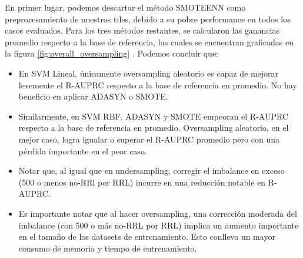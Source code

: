 En primer lugar, podemos descartar el método SMOTEENN como preprocesamiento de nuestros tiles, debido a su pobre performance en todos los casos evaluados. Para los tres métodos restantes, se calcularon las ganancias promedio respecto a la base de referencia, las cuales se encuentran graficadas en la figura \ref{fig:overall_oversampling} . Podemos concluír que:
\begin{itemize}
\item En SVM Lineal, únicamente oversampling aleatorio es capaz de mejorar levemente el R-AUPRC respecto a la base de referencia en promedio. No hay beneficio en aplicar ADASYN o SMOTE.
\item Similarmente, en SVM RBF, ADASYN y SMOTE empeoran el R-AUPRC respecto a la base de referencia en promedio. Oversampling aleatorio, en el mejor caso, logra igualar o superar el R-AUPRC promedio pero con una pérdida importante en el peor caso.
\item Notar que, al igual que en undersampling, corregir el imbalance en exceso (500 o menos no-RRl por RRL) incurre en una reducción notable en R-AUPRC.
\item Es importante notar que al hacer oversampling, una corrección moderada del imbalance (con 500 o más no-RRL por RRL) implica un aumento importante en el tamaño de los datasets de entrenamiento. Esto conlleva un mayor consumo de memoria y tiempo de entrenamiento.
\end{itemize}

